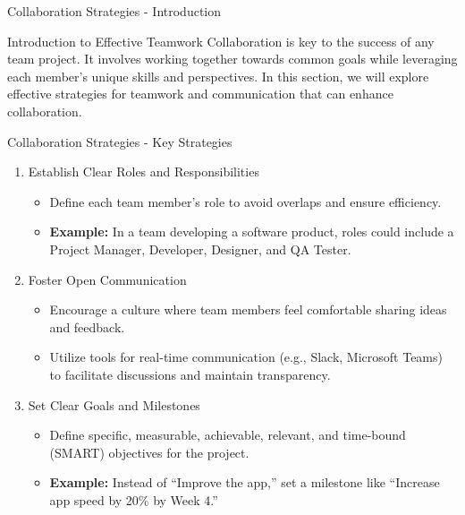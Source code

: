 \documentclass[aspectratio=169]{beamer}
\begin{document}
\begin{frame}[fragile]{Collaboration Strategies - Introduction}
  \begin{block}{Introduction to Effective Teamwork}
    Collaboration is key to the success of any team project. It involves working together towards common goals while leveraging each member’s unique skills and perspectives. In this section, we will explore effective strategies for teamwork and communication that can enhance collaboration.
  \end{block}
\end{frame}

\begin{frame}[fragile]{Collaboration Strategies - Key Strategies}
  \begin{enumerate}
    \item Establish Clear Roles and Responsibilities
    \begin{itemize}
      \item Define each team member's role to avoid overlaps and ensure efficiency.
      \item \textbf{Example:} In a team developing a software product, roles could include a Project Manager, Developer, Designer, and QA Tester.
    \end{itemize}
    
    \item Foster Open Communication
    \begin{itemize}
      \item Encourage a culture where team members feel comfortable sharing ideas and feedback.
      \item Utilize tools for real-time communication (e.g., Slack, Microsoft Teams) to facilitate discussions and maintain transparency.
    \end{itemize}

    \item Set Clear Goals and Milestones
    \begin{itemize}
      \item Define specific, measurable, achievable, relevant, and time-bound (SMART) objectives for the project.
      \item \textbf{Example:} Instead of “Improve the app,” set a milestone like “Increase app speed by 20\% by Week 4.”
    \end{itemize}
  \end{enumerate}
\end{frame}
\end{document}
